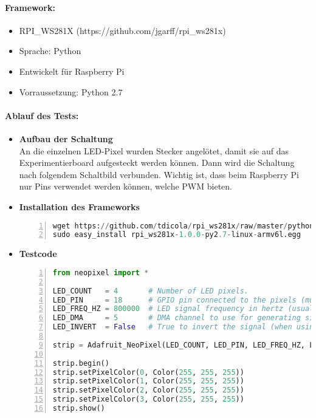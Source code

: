 \paragraph{Framework:}
	\begin{itemize}
	\item RPI\_WS281X (https://github.com/jgarff/rpi\_ws281x)
	\item Sprache: Python
	\item Entwickelt für Raspberry Pi
	\item Vorraussetzung: Python 2.7
	\end{itemize}
\paragraph{Ablauf des Tests:}
\begin{itemize}
\item \textbf{Aufbau der Schaltung}\\
An die einzelnen LED-Pixel wurden Stecker angelötet, damit sie auf das Experimentierboard aufgesteckt werden können. Dann wird die Schaltung nach folgendem Schaltbild verbunden. Wichtig ist, dass beim Raspberry Pi nur Pins verwendet werden können, welche PWM bieten. 
\item \textbf{Installation des Frameworks} 
\begin{lstlisting}[caption = Installation Framework ws281x, language=Python, frame=single, breaklines=true,columns=fullflexible, commentstyle=\color{gray}\upshape, captionpos=b, numbers = left]
wget https://github.com/tdicola/rpi_ws281x/raw/master/python/dist/rpi_ws281x-1.0.0-py2.7-linux-armv6l.egg 
sudo easy_install rpi_ws281x-1.0.0-py2.7-linux-armv6l.egg
\end{lstlisting}
\item \textbf{Testcode}

\begin{lstlisting}[caption = Testcode zur Ansteuerung der LEDs, language=python, frame=single, breaklines=true,columns=fullflexible, commentstyle=\color{gray}\upshape, captionpos=b, numbers = left]
from neopixel import * 
	
LED_COUNT   = 4       # Number of LED pixels. 
LED_PIN     = 18      # GPIO pin connected to the pixels (must support PWM!).
LED_FREQ_HZ = 800000  # LED signal frequency in hertz (usually 800khz)
LED_DMA     = 5       # DMA channel to use for generating signal (try 5)
LED_INVERT  = False   # True to invert the signal (when using NPN)

strip = Adafruit_NeoPixel(LED_COUNT, LED_PIN, LED_FREQ_HZ, LED_DMA, LED_INVERT)

strip.begin()
strip.setPixelColor(0, Color(255, 255, 255))
strip.setPixelColor(1, Color(255, 255, 255))
strip.setPixelColor(2, Color(255, 255, 255))
strip.setPixelColor(3, Color(255, 255, 255))
strip.show()
\end{lstlisting}
\end{itemize}
